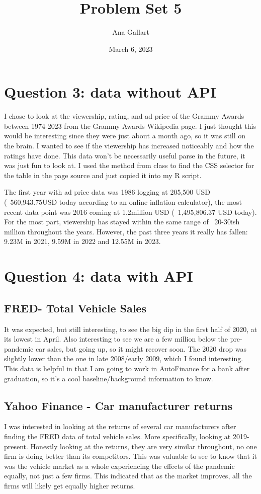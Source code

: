 \documentclass{article}
\title{Problem Set 5}
\author{Ana Gallart}
\date{March 6, 2023}
\begin{document}
\maketitle

\section{Question 3: data without API}

I chose to look at the viewership, rating, and ad price of the Grammy Awards between 1974-2023 from the Grammy Awards Wikipedia page. I just thought this would be interesting since they were just about a month ago, so it was still on the brain. I wanted to see if the viewership has increased noticeably and how the ratings have done. This data won't be necessarily useful parse in the future, it was just fun to look at. I used the method from class to find the CSS selector for the table in the page source and just copied it into my R script. 

The first year with ad price data was 1986 logging at 205,500 USD (~560,943.75USD today according to an online inflation calculator), the most recent data point was 2016 coming at 1.2million USD (~1,495,806.37 USD today). For the most part, viewership has stayed within the same range of ~20-30ish million throughout the years. However, the past three years it really has fallen: 9.23M in 2021, 9.59M in 2022 and 12.55M in 2023.

\section{Question 4: data with API}
\subsection{FRED- Total Vehicle Sales}
It was expected, but still interesting, to see the big dip in the first half of 2020, at its lowest in April. Also interesting to see we are a few million below the pre-pandemic car sales, but going up, so it might recover soon. The 2020 drop was slightly lower than the one in late 2008/early 2009, which I found interesting. This data is helpful in that I am going to work in AutoFinance for a bank after graduation, so it's a cool baseline/background information to know. 


\subsection{Yahoo Finance - Car manufacturer returns}
I was interested in looking at the returns of several car manufacturers after finding the FRED data of total vehicle sales. More specifically, looking at 2019-present. Honestly looking at the returns, they are very similar throughout, no one firm is doing better than its competitors. This was valuable to see to know that it was the vehicle market as a whole experiencing the effects of the pandemic equally, not just a few firms. This indicated that as the market improves, all the firms will likely get equally higher returns. 
\end{document}
